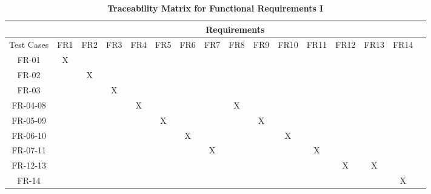 \documentclass[12pt, titlepage]{article}
\begin{document}
\begin{landscape}

\begin{table}[h!]
\centering
\caption{\textbf{Traceability Matrix for Functional Requirements I}}
\label{tab:trace_matrix_01}
\begin{tabular}{|c|c|c|c|c|c|c|c|c|c|c|c|c|c|c|c|}
\hline
& \multicolumn{14}{c|}{Requirements} \\
\hline
Test Cases & FR1 & FR2 & FR3 & FR4 & FR5 & FR6 & FR7 & FR8 & FR9 & FR10 & FR11 & FR12 & FR13 & FR14 \\
\hline
FR-01 & X & & & & & & & & & & & & & \\
\hline
FR-02 & & X & & & & & & & & & & & & \\
\hline
FR-03 & & & X & & & & & & & & & & & \\
\hline
FR-04-08 & & & & X & & & & X & & & & & & \\
\hline
FR-05-09 & & & & & X & & & & X & & & & & \\
\hline
FR-06-10 & & & & & & X & & & & X & & & & \\
\hline
FR-07-11 & & & & & & & X & & & & X & & & \\
\hline
FR-12-13 & & & & & & & & & & & & X & X & \\
\hline
FR-14 & & & & & & & & & & & & & & X \\
\hline
\end{tabular}
\end{table}

\newpage


\end{landscape}
\end{document}
